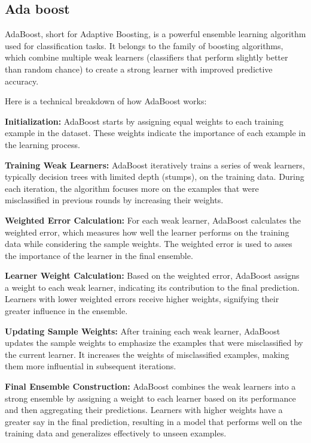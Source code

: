 \documentclass[preprint,aps,nofootinbib,a4paper,superscriptaddress,longbibliography,amsfonts,amssymb,amsmath,titlepage]{revtex4-2}
\begin{document}
\subsection{Ada boost}

AdaBoost, short for Adaptive Boosting, is a powerful ensemble learning algorithm used for classification tasks. It belongs to the family of boosting algorithms, which combine multiple weak learners (classifiers that perform slightly better than random chance) to create a strong learner with improved predictive accuracy.

Here is a technical breakdown of how AdaBoost works:

\textbf{Initialization:} AdaBoost starts by assigning equal weights to each training example in the dataset. These weights indicate the importance of each example in the learning process.

\textbf{Training Weak Learners:} AdaBoost iteratively trains a series of weak learners, typically decision trees with limited depth (stumps), on the training data. During each iteration, the algorithm focuses more on the examples that were misclassified in previous rounds by increasing their weights.

\textbf{Weighted Error Calculation:} For each weak learner, AdaBoost calculates the weighted error, which measures how well the learner performs on the training data while considering the sample weights. The weighted error is used to asses the importance of the learner in the final ensemble.

\textbf{Learner Weight Calculation:} Based on the weighted error, AdaBoost assigns a weight to each weak learner, indicating its contribution to the final prediction. Learners with lower weighted errors receive higher weights, signifying their greater influence in the ensemble.

\textbf{Updating Sample Weights:} After training each weak learner, AdaBoost updates the sample weights to emphasize the examples that were misclassified by the current learner. It increases the weights of misclassified examples, making them more influential in subsequent iterations.

\textbf{Final Ensemble Construction:} AdaBoost combines the weak learners into a strong ensemble by assigning a weight to each learner based on its performance and then aggregating their predictions. Learners with higher weights have a greater say in the final prediction, resulting in a model that performs well on the training data and generalizes effectively to unseen examples.
\end{document}
